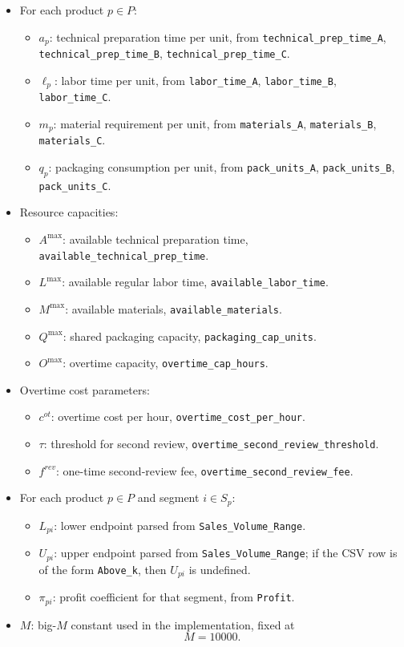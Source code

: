 \begin{itemize}
    \item For each product $p \in P$:
    \begin{itemize}
        \item $a_p$: technical preparation time per unit, from \texttt{technical\_prep\_time\_A}, \texttt{technical\_prep\_time\_B}, \texttt{technical\_prep\_time\_C}.
        \item $\ell_p$: labor time per unit, from \texttt{labor\_time\_A}, \texttt{labor\_time\_B}, \texttt{labor\_time\_C}.
        \item $m_p$: material requirement per unit, from \texttt{materials\_A}, \texttt{materials\_B}, \texttt{materials\_C}.
        \item $q_p$: packaging consumption per unit, from \texttt{pack\_units\_A}, \texttt{pack\_units\_B}, \texttt{pack\_units\_C}.
    \end{itemize}
    \item Resource capacities:
    \begin{itemize}
        \item $A^{\max}$: available technical preparation time, \texttt{available\_technical\_prep\_time}.
        \item $L^{\max}$: available regular labor time, \texttt{available\_labor\_time}.
        \item $M^{\max}$: available materials, \texttt{available\_materials}.
        \item $Q^{\max}$: shared packaging capacity, \texttt{packaging\_cap\_units}.
        \item $O^{\max}$: overtime capacity, \texttt{overtime\_cap\_hours}.
    \end{itemize}
    \item Overtime cost parameters:
    \begin{itemize}
        \item $c^{ot}$: overtime cost per hour, \texttt{overtime\_cost\_per\_hour}.
        \item $\tau$: threshold for second review, \texttt{overtime\_second\_review\_threshold}.
        \item $f^{rev}$: one-time second-review fee, \texttt{overtime\_second\_review\_fee}.
    \end{itemize}
    \item For each product $p \in P$ and segment $i \in S_p$:
    \begin{itemize}
        \item $L_{pi}$: lower endpoint parsed from \texttt{Sales\_Volume\_Range}.
        \item $U_{pi}$: upper endpoint parsed from \texttt{Sales\_Volume\_Range}; if the CSV row is of the form \texttt{Above\_k}, then $U_{pi}$ is undefined.
        \item $\pi_{pi}$: profit coefficient for that segment, from \texttt{Profit}.
    \end{itemize}
    \item $M$: big-$M$ constant used in the implementation, fixed at
    \[
    M=10000.
    \]
\end{itemize}

